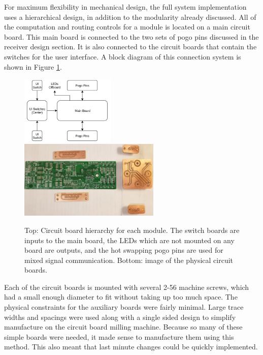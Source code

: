 \documentclass{article}
\begin{document}
	For maximum flexibility in mechanical design, the full system implementation uses a hierarchical design, in addition to the modularity already discussed.  All of the computation and routing controls for a module is located on a main circuit board.  This main board is connected to the two sets of pogo pins discussed in the receiver design section.  It is also connected to the circuit boards that contain the switches for the user interface.  A block diagram of this connection system is shown in Figure \ref{fig:ModulePCBHierarchy}.

	\begin{figure}
		\centering
		\includegraphics[width = 0.4\textwidth]{PR5Images/PCBHierarchy.png}
		\includegraphics[width = 0.6\textwidth, angle = 180]{PR5Images/PCBs.png}
		\caption{Top: Circuit board hierarchy for each module.  The switch boards are inputs to the main board, the LEDs which are not mounted on any board are outputs, and the hot swapping pogo pins are used for mixed signal communication.  Bottom: image of the physical circuit boards.}
		\label{fig:ModulePCBHierarchy}
	\end{figure}

	Each of the circuit boards is mounted with several 2-56 machine screws, which had a small enough diameter to fit without taking up too much space.  The physical constraints for the auxiliary boards were fairly minimal.  Large trace widths and spacings were used along with a single sided design to simplify manufacture on the circuit board milling machine.  Because so many of these simple boards were needed, it made sense to manufacture them using this method.  This also meant that last minute changes could be quickly implemented.
\end{document}
